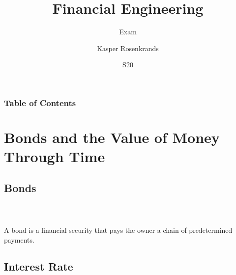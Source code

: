 \documentclass{beamer}
\title{Financial Engineering}
\subtitle{Exam}
\author{Kasper Rosenkrands}
\institute{Aalborg University}
\date{S20}
\numberwithin{equation}{section}
\begin{document}
\frame{\titlepage}

\begin{frame}
\frametitle{Table of Contents}
\tableofcontents[hideallsubsections]
\end{frame}

\section{Bonds and the Value of Money Through Time}

\subsection{Bonds}

\begin{frame}\frametitle{{\normalsize \secname} \\ {\large \subsecname}}
    \begin{definition}[Bond]\label{def:bond}
        A bond is a financial security that pays the owner a chain of predetermined payments.
    \end{definition}
\end{frame}

%

\subsection{Interest Rate}
\end{document}
